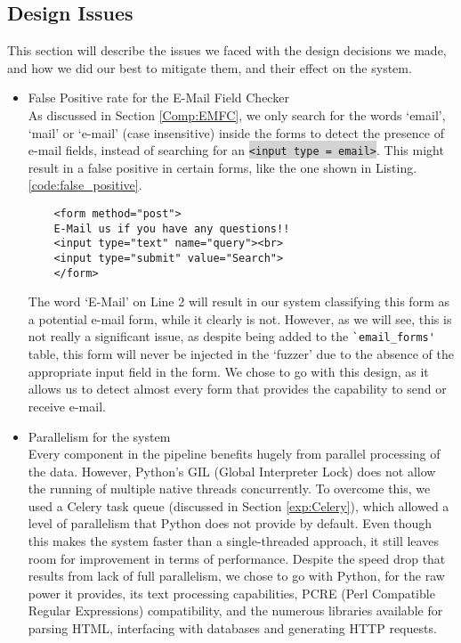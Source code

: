 \subsection[Issues]{Design Issues}
\label{sys:issues}
This section will describe the issues we faced with the design decisions we made, and how we did our best to mitigate them, and their effect on the system.

\begin{itemize}
	\item \label{issues:fpr}False Positive rate for the E-Mail Field Checker\\
	As discussed in Section \ref{Comp:EMFC}, we only search for the words `email', `mail' or `e-mail' (case insensitive) inside the forms to detect the presence of e-mail fields, instead of searching for an \colorbox{lightgray}{\lstinline{<input type = email>}}. This might result in a false positive in certain forms, like the one shown in Listing. \ref{code:false_positive}.
	
	\begin{lstlisting}
	<form method="post">
	E-Mail us if you have any questions!!
	<input type="text" name="query"><br>
	<input type="submit" value="Search">
	</form>
	\end{lstlisting}
	
	The word `E-Mail' on Line 2 will result in our system classifying this form as a potential e-mail form, while it clearly is not. However, as we will see, this is not really a significant issue, as despite being added to the \lstinline{`email_forms'} table, this form will never be injected in the `fuzzer' due to the absence of the appropriate input field in the form. We chose to go with this design, as it allows us to detect almost every form that provides the capability to send or receive e-mail.
	
	\item Parallelism for the system\\
	\label{issues:parallel}
	Every component in the pipeline benefits hugely from parallel processing of the data. However, Python's GIL (Global Interpreter Lock) does not allow the running of multiple native threads concurrently. To overcome this, we used a Celery task queue (discussed in Section \ref{exp:Celery}), which allowed a level of parallelism that Python does not provide by default. Even though this makes the system faster than a single-threaded approach, it still leaves room for improvement in terms of performance. Despite the speed drop that results from lack of full parallelism, we chose to go with Python, for the raw power it provides, its text processing capabilities, PCRE (Perl Compatible Regular Expressions) compatibility, and the numerous libraries available for parsing HTML, interfacing with databases and generating HTTP requests.
	

\end{itemize}
